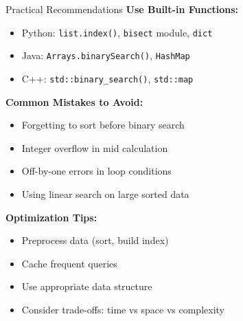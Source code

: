 \documentclass[aspectratio=169]{beamer}
\begin{document}
\begin{frame}{Practical Recommendations}
  \textbf{Use Built-in Functions:}
  \begin{itemize}
    \item Python: \texttt{list.index()}, \texttt{bisect} module, \texttt{dict}
    \item Java: \texttt{Arrays.binarySearch()}, \texttt{HashMap}
    \item C++: \texttt{std::binary\_search()}, \texttt{std::map}
  \end{itemize}

  \vspace{0.3cm}
  \textbf{Common Mistakes to Avoid:}
  \begin{itemize}
    \item Forgetting to sort before binary search
    \item Integer overflow in mid calculation
    \item Off-by-one errors in loop conditions
    \item Using linear search on large sorted data
  \end{itemize}

  \vspace{0.3cm}
  \textbf{Optimization Tips:}
  \begin{itemize}
    \item Preprocess data (sort, build index)
    \item Cache frequent queries
    \item Use appropriate data structure
    \item Consider trade-offs: time vs space vs complexity
  \end{itemize}
\end{frame}
\end{document}
